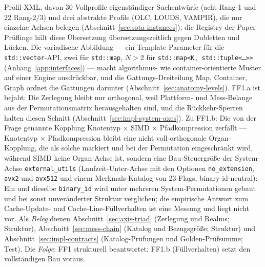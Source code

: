 \begin{nurlang}
Profil-XML, davon 30 Vollprofile eigenständiger Suchentwürfe (acht Rang-1 und 22 Rang-2/3) und drei
abstrakte Profile (OLC, LOUDS, VAMPIR), die nur einzelne Achsen belegen
(Abschnitt~\ref{sec:sota-instances}); die Registry der Paper-Prüflinge hält diese Übersetzung
übersetzungszeitlich gegen Dubletten und Lücken. Die variadische Abbildung --- ein Template-Parameter für
die \texttt{std::vector}-API, zwei für \texttt{std::map}, $N>2$ für
\texttt{std::map<K,\,std::tuple<\ldots>>} (Anhang~\ref{app:interfaces}) --- macht algorithmus- wie
container-orientierte Muster auf einer Engine ausdrückbar, und die Gattungs-Dreiteilung Map, Container,
Graph ordnet die Gattungen darunter (Abschnitt~\ref{sec:anatomy-levels}). FF1.a ist bejaht: Die Zerlegung
bleibt nur orthogonal, weil Plattform- und Mess-Belange aus der Permutationsmatrix herausgehalten sind,
und die Rückkehr-Sperren halten diesen Schnitt (Abschnitt~\ref{sec:impl-system-axes}). Zu FF1.b: Die von
der Frage genannte Kopplung Knotentyp $\times$ SIMD $\times$ Pfadkompression zerfällt --- Knotentyp
$\times$ Pfadkompression bleibt eine nicht voll-orthogonale Organ-Kopplung, die als solche markiert und
bei der Permutation eingeschränkt wird, während SIMD keine Organ-Achse ist, sondern eine Bau-Steuergröße
der System-Achse \texttt{external\_utils} (Laufzeit-Unter-Achse mit den Optionen
\texttt{no\_extension}, \texttt{avx2} und \texttt{avx512} und einem Merkmals-Katalog von 23 Flags,
binary-id-neutral): Ein und dieselbe \texttt{binary\_id} wird unter mehreren System-Permutationen
gebaut und bei sonst unveränderter Struktur verglichen; die empirische Antwort zum Cache-Update- und
Cache-Line-Füllverhalten ist eine Messung und liegt nicht vor. Als \emph{Beleg} dienen
Abschnitt~\ref{sec:axis-triad} (Zerlegung und Realms; Struktur), Abschnitt~\ref{sec:mess-chain}
(Katalog
und Bezugsgröße; Struktur) und Abschnitt~\ref{sec:impl-contracts} (Katalog-Prüfungen und Golden-Prüfsumme; Test).
Die \emph{Folge}: FF1 strukturell beantwortet; FF1.b (Füllverhalten) setzt den vollständigen Bau voraus.
\end{nurlang}

